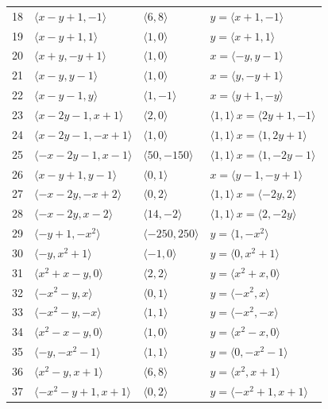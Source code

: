 \documentclass[11pt]{article}
\begin{document}
\begin{longtable}{@{}rlll@{}}
18 & $\langle x-y+1,-1\rangle$ & $\langle 6,8\rangle$ & $y=\langle x+1,-1\rangle$\\
19 & $\langle x-y+1,1\rangle$ & $\langle 1,0\rangle$ & $y=\langle x+1,1\rangle$\\
20 & $\langle x+y,-y+1\rangle$ & $\langle 1,0\rangle$ & $x=\langle -y,y-1\rangle$\\
21 & $\langle x-y,y-1\rangle$ & $\langle 1,0\rangle$ & $x=\langle y,-y+1\rangle$\\
22 & $\langle x-y-1,y\rangle$ & $\langle 1,-1\rangle$ & $x=\langle y+1,-y\rangle$\\
23 & $\langle x-2y-1,x+1\rangle$ & $\langle 2,0\rangle$ & $\langle 1,1\rangle\,x=\langle 2y+1,-1\rangle$\\
24 & $\langle x-2y-1,-x+1\rangle$ & $\langle 1,0\rangle$ & $\langle 1,1\rangle\,x=\langle 1,2y+1\rangle$\\
25 & $\langle -x-2y-1,x-1\rangle$ & $\langle 50,-150\rangle$ & $\langle 1,1\rangle\,x=\langle 1,-2y-1\rangle$\\
26 & $\langle x-y+1,y-1\rangle$ & $\langle 0,1\rangle$ & $x=\langle y-1,-y+1\rangle$\\
27 & $\langle -x-2y,-x+2\rangle$ & $\langle 0,2\rangle$ & $\langle 1,1\rangle\,x=\langle -2y,2\rangle$\\
28 & $\langle -x-2y,x-2\rangle$ & $\langle 14,-2\rangle$ & $\langle 1,1\rangle\,x=\langle 2,-2y\rangle$\\
29 & $\langle -y+1,-x^{2}\rangle$ & $\langle -250,250\rangle$ & $y=\langle 1,-x^{2}\rangle$\\
30 & $\langle -y,x^{2}+1\rangle$ & $\langle -1,0\rangle$ & $y=\langle 0,x^{2}+1\rangle$\\
31 & $\langle x^{2}+x-y,0\rangle$ & $\langle 2,2\rangle$ & $y=\langle x^{2}+x,0\rangle$\\
32 & $\langle -x^{2}-y,x\rangle$ & $\langle 0,1\rangle$ & $y=\langle -x^{2},x\rangle$\\
33 & $\langle -x^{2}-y,-x\rangle$ & $\langle 1,1\rangle$ & $y=\langle -x^{2},-x\rangle$\\
34 & $\langle x^{2}-x-y,0\rangle$ & $\langle 1,0\rangle$ & $y=\langle x^{2}-x,0\rangle$\\
35 & $\langle -y,-x^{2}-1\rangle$ & $\langle 1,1\rangle$ & $y=\langle 0,-x^{2}-1\rangle$\\
36 & $\langle x^{2}-y,x+1\rangle$ & $\langle 6,8\rangle$ & $y=\langle x^{2},x+1\rangle$\\
37 & $\langle -x^{2}-y+1,x+1\rangle$ & $\langle 0,2\rangle$ & $y=\langle -x^{2}+1,x+1\rangle$\\

\end{longtable}
\end{document}
